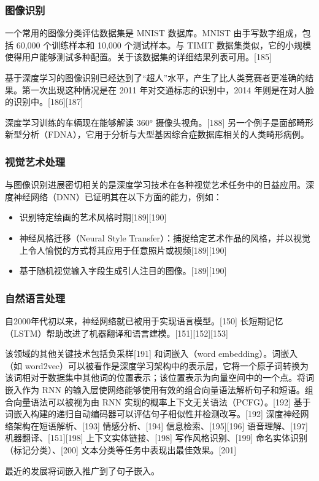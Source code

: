 \subsubsection{图像识别}
一个常用的图像分类评估数据集是 MNIST 数据库。MNIST 由手写数字组成，包括 60,000 个训练样本和 10,000 个测试样本。与 TIMIT 数据集类似，它的小规模使得用户能够测试多种配置。关于该数据集的详细结果列表可用。[185]

基于深度学习的图像识别已经达到了“超人”水平，产生了比人类竞赛者更准确的结果。第一次出现这种情况是在 2011 年对交通标志的识别中，2014 年则是在对人脸的识别中。[186][187]

深度学习训练的车辆现在能够解读 360° 摄像头视角。[188] 另一个例子是面部畸形新型分析（FDNA），它用于分析与大型基因综合症数据库相关的人类畸形病例。
\subsubsection{视觉艺术处理}
与图像识别进展密切相关的是深度学习技术在各种视觉艺术任务中的日益应用。深度神经网络（DNN）已证明其在以下方面的能力，例如：
\begin{itemize}
\item 识别特定绘画的艺术风格时期[189][190]  
\item 神经风格迁移（Neural Style Transfer）：捕捉给定艺术作品的风格，并以视觉上令人愉悦的方式将其应用于任意照片或视频[189][190]  
\item 基于随机视觉输入字段生成引人注目的图像。[189][190]
\end{itemize}
\subsubsection{自然语言处理}  
自2000年代初以来，神经网络就已被用于实现语言模型。[150] 长短期记忆（LSTM）帮助改进了机器翻译和语言建模。[151][152][153]  

该领域的其他关键技术包括负采样[191] 和词嵌入（word embedding）。词嵌入（如 word2vec）可以被看作是深度学习架构中的表示层，它将一个原子词转换为该词相对于数据集中其他词的位置表示；该位置表示为向量空间中的一个点。将词嵌入作为 RNN 的输入层使网络能够使用有效的组合向量语法解析句子和短语。组合向量语法可以被视为由 RNN 实现的概率上下文无关语法（PCFG）。[192] 基于词嵌入构建的递归自动编码器可以评估句子相似性并检测改写。[192] 深度神经网络架构在短语解析、[193] 情感分析、[194] 信息检索、[195][196] 语音理解、[197] 机器翻译、[151][198] 上下文实体链接、[198] 写作风格识别、[199] 命名实体识别（标记分类）、[200] 文本分类等任务中表现出最佳效果。[201]  

最近的发展将词嵌入推广到了句子嵌入。  

